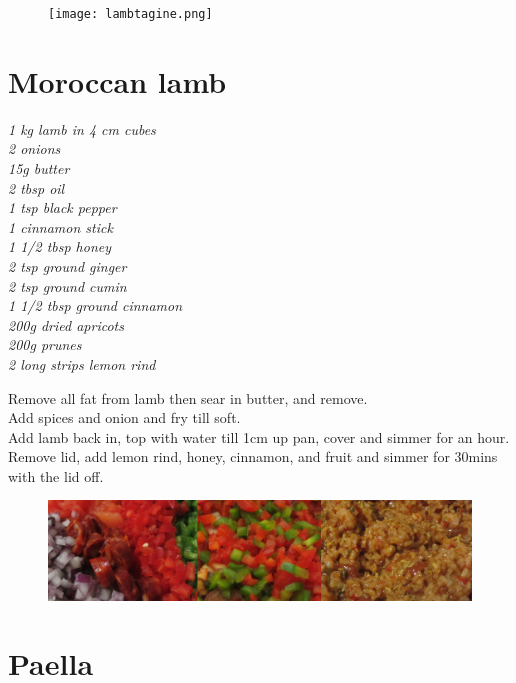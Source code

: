 \documentclass{tufte-book}
\begin{document}
\newpage

\begin{figure}[h]
  \texttt{[image: lambtagine.png]}
\end{figure}

\section{Moroccan lamb}

\emph{1 kg lamb in 4 cm cubes
\\2 onions
\\15g butter
\\2 tbsp oil
\\1 tsp black pepper
\\1 cinnamon stick
\\1 1/2 tbsp honey
\\2 tsp ground ginger
\\2 tsp ground cumin
\\1 1/2 tbsp ground cinnamon
\\200g dried apricots
\\200g prunes
\\2 long strips lemon rind}

\smallskip
Remove all fat from lamb then sear in butter, and remove.
\\Add spices and onion and fry till soft.
\\Add lamb back in, top with water till 1cm up pan, cover and simmer for an hour.
\\Remove lid, add lemon rind, honey, cinnamon, and fruit and simmer for 30mins with the lid off.

\newpage


\begin{figure}[h]
  \includegraphics[width=\linewidth]{paella.png}
\end{figure}

\section{Paella}
\end{document}

